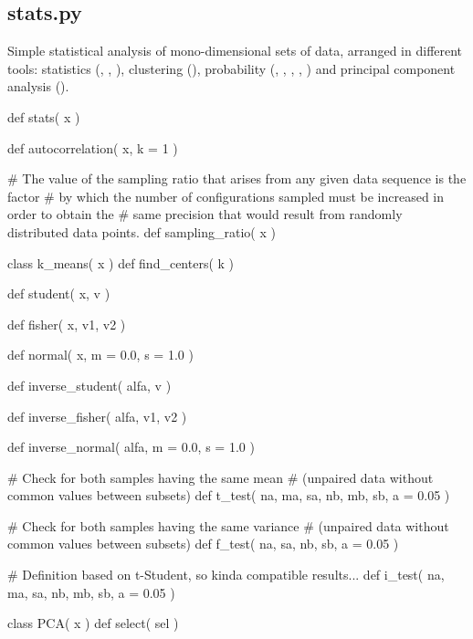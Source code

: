 \normalsize
\subsection[stats]{stats.py}
Simple statistical analysis of mono-dimensional sets of data, arranged in different tools: statistics (,
, ), clustering (), probability (,
, , , ) and principal component analysis ().

\begin{pyglist}[language=python,fvset={frame=single}]
def stats( x )

def autocorrelation( x, k = 1 )

# The value of the sampling ratio that arises from any given data sequence is the factor 
# by which the number of configurations sampled must be increased in order to obtain the
# same precision that would result from randomly distributed data points.
def sampling_ratio( x )

class k_means( x )
    def find_centers( k )

def student( x, v )

def fisher( x, v1, v2 )

def normal( x, m = 0.0, s = 1.0 )

def inverse_student( alfa, v )

def inverse_fisher( alfa, v1, v2 )

def inverse_normal( alfa, m = 0.0, s = 1.0 )

# Check for both samples having the same mean
#        (unpaired data without common values between subsets)
def t_test( na, ma, sa, nb, mb, sb, a = 0.05 )

# Check for both samples having the same variance
#        (unpaired data without common values between subsets)
def f_test( na, sa, nb, sb, a = 0.05 )

# Definition based on t-Student, so kinda compatible results...
def i_test( na, ma, sa, nb, mb, sb, a = 0.05 )

class PCA( x )
    def select( sel )
\end{pyglist}

